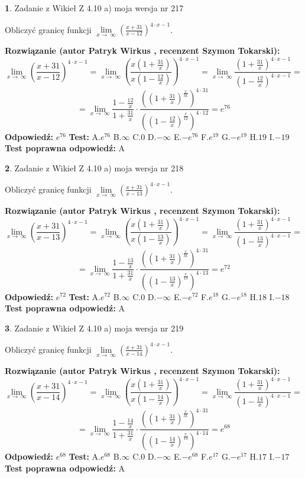 \documentclass[12pt, a4paper]{article}
\theoremstyle{definition} %
\newtheorem{zad}{}
\newcommand{\zadStart}[1]{\begin{zad}#1\newline}
\newcommand{\zadStop}{\end{zad}}
\newcommand{\rozwStart}[2]{\noindent \textbf{Rozwiązanie (autor #1 , recenzent #2): }\newline}
\newcommand{\rozwStop}{\newline}
\newcommand{\odpStart}{\noindent \textbf{Odpowiedź:}\newline}
\newcommand{\odpStop}{\newline}
\newcommand{\testStart}{\noindent \textbf{Test:}\newline}
\newcommand{\testStop}{\newline}
\newcommand{\kluczStart}{\noindent \textbf{Test poprawna odpowiedź:}\newline}
\newcommand{\kluczStop}{\newline}
\begin{document}
\zadStart{Zadanie z Wikieł Z 4.10 a) moja wersja nr 217}

Obliczyć granicę funkcji  $\lim\limits_{x\to\ \infty}(\frac{x+31}{x-12})^{4\cdot x-1}$.
\zadStop
\rozwStart{Patryk Wirkus}{Szymon Tokarski}
$$\lim\limits_{x\to\ \infty}(\frac{x+31}{x-12})^{4\cdot x-1} = \lim\limits_{x\to\ \infty}(\frac{x(1+\frac{31}{x})}{x(1-\frac{12}{x})})^{4\cdot x-1}=\lim\limits_{x\to\ \infty}\frac{(1+\frac{31}{x})^{4\cdot x-1}}{(1-\frac{12}{x})^{4\cdot x-1}}=$$
$$=\lim\limits_{x\to\ \infty}\frac{1-\frac{12}{x}}{1+\frac{31}{x}}\cdot\frac{((1+\frac{31}{x})^{\frac{x}{31}})^{4\cdot31}}{((1-\frac{12}{x})^{\frac{x}{12}})^{4\cdot12}}=e^{76}$$
\rozwStop
\odpStart
$e^{76}$
\odpStop
\testStart
A.$e^{76}$ B.$\infty$ C.$0$ D.$-\infty$ E.$-e^{76}$
F.$e^{19}$ G.$-e^{19}$
H.$19$
I.$-19$
\testStop
\kluczStart
A
\kluczStop



\zadStart{Zadanie z Wikieł Z 4.10 a) moja wersja nr 218}

Obliczyć granicę funkcji  $\lim\limits_{x\to\ \infty}(\frac{x+31}{x-13})^{4\cdot x-1}$.
\zadStop
\rozwStart{Patryk Wirkus}{Szymon Tokarski}
$$\lim\limits_{x\to\ \infty}(\frac{x+31}{x-13})^{4\cdot x-1} = \lim\limits_{x\to\ \infty}(\frac{x(1+\frac{31}{x})}{x(1-\frac{13}{x})})^{4\cdot x-1}=\lim\limits_{x\to\ \infty}\frac{(1+\frac{31}{x})^{4\cdot x-1}}{(1-\frac{13}{x})^{4\cdot x-1}}=$$
$$=\lim\limits_{x\to\ \infty}\frac{1-\frac{13}{x}}{1+\frac{31}{x}}\cdot\frac{((1+\frac{31}{x})^{\frac{x}{31}})^{4\cdot31}}{((1-\frac{13}{x})^{\frac{x}{13}})^{4\cdot13}}=e^{72}$$
\rozwStop
\odpStart
$e^{72}$
\odpStop
\testStart
A.$e^{72}$ B.$\infty$ C.$0$ D.$-\infty$ E.$-e^{72}$
F.$e^{18}$ G.$-e^{18}$
H.$18$
I.$-18$
\testStop
\kluczStart
A
\kluczStop



\zadStart{Zadanie z Wikieł Z 4.10 a) moja wersja nr 219}

Obliczyć granicę funkcji  $\lim\limits_{x\to\ \infty}(\frac{x+31}{x-14})^{4\cdot x-1}$.
\zadStop
\rozwStart{Patryk Wirkus}{Szymon Tokarski}
$$\lim\limits_{x\to\ \infty}(\frac{x+31}{x-14})^{4\cdot x-1} = \lim\limits_{x\to\ \infty}(\frac{x(1+\frac{31}{x})}{x(1-\frac{14}{x})})^{4\cdot x-1}=\lim\limits_{x\to\ \infty}\frac{(1+\frac{31}{x})^{4\cdot x-1}}{(1-\frac{14}{x})^{4\cdot x-1}}=$$
$$=\lim\limits_{x\to\ \infty}\frac{1-\frac{14}{x}}{1+\frac{31}{x}}\cdot\frac{((1+\frac{31}{x})^{\frac{x}{31}})^{4\cdot31}}{((1-\frac{14}{x})^{\frac{x}{14}})^{4\cdot14}}=e^{68}$$
\rozwStop
\odpStart
$e^{68}$
\odpStop
\testStart
A.$e^{68}$ B.$\infty$ C.$0$ D.$-\infty$ E.$-e^{68}$
F.$e^{17}$ G.$-e^{17}$
H.$17$
I.$-17$
\testStop
\kluczStart
A
\kluczStop
\end{document}
